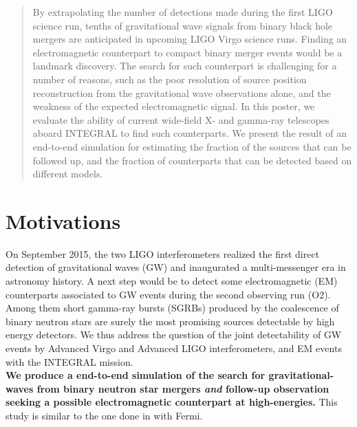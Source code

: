 \documentclass[a0,portrait]{a0poster}
\renewcommand{\emph}[1]{\textbf{\color{blue}#1}}
\newcommand{\ECM}[1] {\textbf{\textcolor{magenta}{#1}}}
\begin{document}
\begin{multicols}{2} %


 \begin{abstract}
   By extrapolating the number of detections made during the first
   LIGO science run, tenths of gravitational wave signals from binary
   black hole mergers are anticipated in upcoming LIGO Virgo science
   runs. Finding an electromagnetic counterpart to compact binary
   merger events would be a landmark discovery. The search for such
   counterpart is challenging for a number of reasons, such as the
   poor resolution of source position reconstruction from the
   gravitational wave observations alone, and the weakness of the
   expected electromagnetic signal. In this poster, we evaluate the
   ability of current wide-field X- and gamma-ray telescopes aboard
   INTEGRAL to find such counterparts. We present the result of an
   end-to-end simulation for estimating the fraction of the sources
   that can be followed up, and the fraction of counterparts that can
   be detected based on different models.
 \end{abstract}


\section*{Motivations}

On September 2015, the two LIGO interferometers realized the first direct detection of gravitational waves (GW) and inaugurated a multi-messenger era in astronomy history. A next step would be to detect some electromagnetic (EM) counterparts associated to GW events during the second observing run (O2). Among them short gamma-ray bursts (SGRBs) produced by the coalescence of binary neutron stars are surely the most promising sources detectable by high energy detectors. We thus address the question of the joint detectability of GW events by Advanced Virgo and Advanced LIGO interferometers, and EM events with the INTEGRAL mission. \\
\emph{We produce a end-to-end simulation of the search for gravitational-waves
from binary neutron star mergers \textit{and} follow-up observation seeking a
 possible electromagnetic counterpart at high-energies.} This study is similar
to the one done in \cite{2016arXiv160606124P} with Fermi.


\end{multicols}
\end{document}
